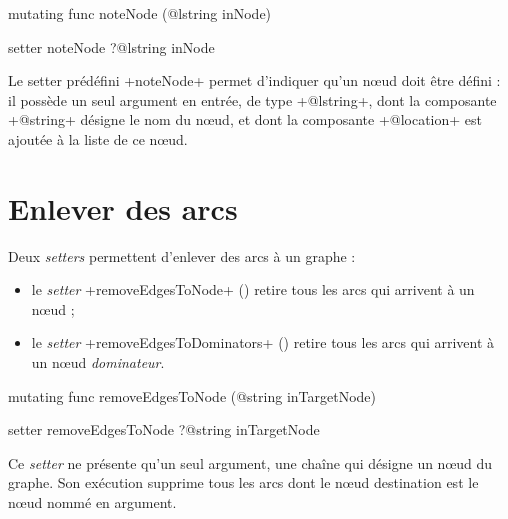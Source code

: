 
\begin{galgas4}
mutating func noteNode (@lstring inNode)
\end{galgas4}

\begin{galgas3}
setter noteNode ?@lstring inNode
\end{galgas3}

Le setter prédéfini \ggst+noteNode+ permet d'indiquer qu'un nœud doit être défini : il possède un seul argument en entrée, de type \ggst+@lstring+, dont la composante \ggst+@string+ désigne le nom du nœud, et dont la composante \ggst+@location+ est ajoutée à la liste de ce nœud.



\section{Enlever des arcs}

Deux \emph{setters} permettent d'enlever des arcs à un graphe :
\begin{itemize}
  \item le \emph{setter} \ggst+removeEdgesToNode+ () retire tous les arcs qui arrivent à un nœud ;
  \item le \emph{setter} \ggst+removeEdgesToDominators+ () retire tous les arcs qui arrivent à un nœud \emph{dominateur}.
\end{itemize}




\begin{galgas4}
mutating func removeEdgesToNode (@string inTargetNode)
\end{galgas4}

\begin{galgas3}
setter removeEdgesToNode ?@string inTargetNode
\end{galgas3}

Ce \emph{setter} ne présente qu'un seul argument, une chaîne qui désigne un nœud du graphe. Son exécution supprime tous les arcs dont le nœud destination est le nœud nommé en argument.


